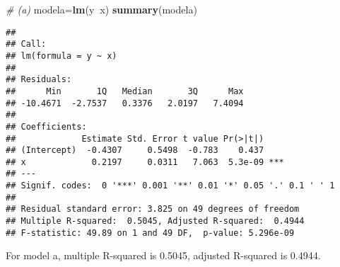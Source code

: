 \documentclass[]{article}
\newenvironment{Shaded}{\begin{snugshade}}{\end{snugshade}}
\newcommand{\KeywordTok}[1]{\textcolor[rgb]{0.13,0.29,0.53}{\textbf{#1}}}
\newcommand{\DataTypeTok}[1]{\textcolor[rgb]{0.13,0.29,0.53}{#1}}
\newcommand{\DecValTok}[1]{\textcolor[rgb]{0.00,0.00,0.81}{#1}}
\newcommand{\StringTok}[1]{\textcolor[rgb]{0.31,0.60,0.02}{#1}}
\newcommand{\CommentTok}[1]{\textcolor[rgb]{0.56,0.35,0.01}{\textit{#1}}}
\newcommand{\OperatorTok}[1]{\textcolor[rgb]{0.81,0.36,0.00}{\textbf{#1}}}
\newcommand{\NormalTok}[1]{#1}
\begin{document}
\begin{Shaded}
\end{Shaded}

\begin{Shaded}
\begin{Highlighting}[]
\CommentTok{# (a) }
\NormalTok{modela=}\KeywordTok{lm}\NormalTok{(y}\OperatorTok{~}\NormalTok{x)}
\KeywordTok{summary}\NormalTok{(modela)}
\end{Highlighting}
\end{Shaded}

\begin{verbatim}
## 
## Call:
## lm(formula = y ~ x)
## 
## Residuals:
##      Min       1Q   Median       3Q      Max 
## -10.4671  -2.7537   0.3376   2.0197   7.4094 
## 
## Coefficients:
##             Estimate Std. Error t value Pr(>|t|)    
## (Intercept)  -0.4307     0.5498  -0.783    0.437    
## x             0.2197     0.0311   7.063  5.3e-09 ***
## ---
## Signif. codes:  0 '***' 0.001 '**' 0.01 '*' 0.05 '.' 0.1 ' ' 1
## 
## Residual standard error: 3.825 on 49 degrees of freedom
## Multiple R-squared:  0.5045, Adjusted R-squared:  0.4944 
## F-statistic: 49.89 on 1 and 49 DF,  p-value: 5.296e-09
\end{verbatim}

For model a, multiple R-squared is 0.5045, adjusted R-squared is 0.4944.

\begin{Shaded}
\end{Shaded}
\end{document}
